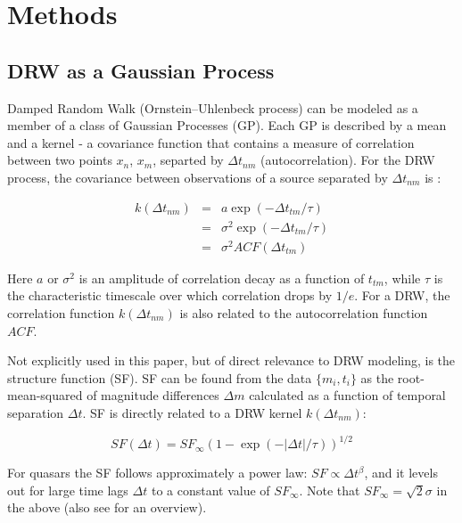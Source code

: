 \documentclass[twocolumn]{aastex62}
\begin{document}
%
%
%
%
%
\section{Methods}\label{sec:methods}
\subsection{DRW as a Gaussian Process}
Damped Random Walk (Ornstein–Uhlenbeck process) can be modeled as a member of a class of Gaussian Processes (GP). Each GP is described by a mean and a kernel - a covariance function that contains a measure of correlation between two points $x_{n}$, $x_{m}$, separted by $\Delta t_{nm}$ (autocorrelation). For the  DRW process, the covariance  between observations of a source separated by $\Delta t_{nm}$ is : 

\begin{eqnarray}
k(\Delta t_{nm}) &=& a \exp{(-\Delta t_{tm} / \tau)} \\
                 &=& \sigma^{2}\exp{(-\Delta t_{tm} / \tau)}  \\
                 &=& \sigma^{2} ACF(\Delta t_{tm})
\end{eqnarray} 

Here $a$ or $\sigma^{2}$ is an amplitude of correlation decay as a function of $t_{tm}$,  while $\tau$ is the characteristic timescale over which correlation drops by $1/e$. For a DRW,  the correlation function $k(\Delta t_{nm})$ is also related to the autocorrelation function $ACF$. 

Not explicitly used in this paper, but of direct relevance to DRW modeling, is the structure function (SF). SF can be found from the data $\{m_{i},t_{i}\}$ as the root-mean-squared of  magnitude differences $\Delta m$  calculated as a function of temporal separation $\Delta t$. SF is directly related to a DRW kernel $k(\Delta t_{nm})$:

\begin{equation}
SF(\Delta t) = SF_{\infty} (1-\exp{(-|\Delta t|/\tau)})^{1/2}
\end{equation}

For quasars the SF follows approximately a power law: $SF \propto \Delta t^{\beta}$,  and it levels out for large time lags $\Delta t$ to a constant value of $SF_{\infty}$.   Note that $SF_\infty = \sqrt{2} \sigma$  in the above (also see \citet{macleod2012, bauer2009, graham2015a} for an overview).
\end{document}
